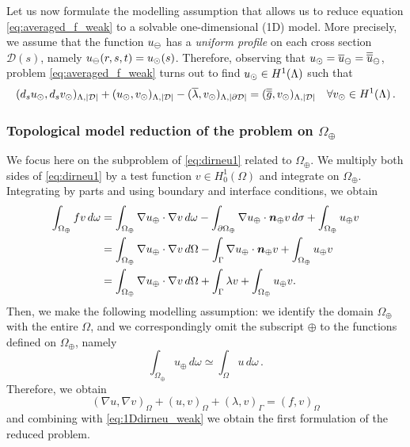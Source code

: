 \documentclass[r]{siamart171218}
\begin{document}
Let us now formulate the modelling assumption that allows us to reduce equation \eqref{eq:averaged_f_weak} to a solvable one-dimensional (1D) model.
More precisely, we assume that the function $u_{\ominus}$ has a \emph{uniform profile} on each cross section $\mathcal{D}(s)$, namely $u_{\ominus}(r,s,t) = u_{\odot}(s)$.
Therefore, observing that $u_{\odot}=\overline{u}_{\ominus}=\overline{\overline{u}}_{\ominus}$, problem \eqref{eq:averaged_f_weak} turns out to find $u_{\odot} \in H^1(\Lambda)$ such that
\begin{equation}\label{eq:1Ddirneu_weak}
 (d_s \ud, d_s \vd)_{\Lambda,|\mathcal{D}|} 
+(\ud, \vd)_{\Lambda, |\D|}
-(\avrc{\lambda},\vd)_{\Lambda, |\DD|}
=  (\avrd{g},\vd)_{\Lambda, |\mathcal{D}|}
\quad \forall \vd \in H^1(\Lambda)\,.
\end{equation}

\subsubsection*{Topological model reduction of the problem on $\Omega_{\oplus}$}
We focus here on the subproblem of \eqref{eq:dirneu1} related to $\Omega_{\oplus}$.
We multiply both sides of \eqref{eq:dirneu1} by a test function $v\in H^1_0(\Omega)$ and integrate on $\Omega_\oplus$. Integrating by parts and using boundary and interface conditions, we obtain
\begin{equation*}
\begin{split}
\int_{\Omega _{\oplus}}fv\,d\omega&=
\int _{\Omega _{\oplus}}\nabla u_{\oplus} \cdot\nabla v\,d\omega -\int _{\partial \Omega _{\oplus}}\nabla u_{\oplus} \cdot \boldsymbol n_{\oplus} v\,d\sigma + \int_{\Omega_{\oplus}} u_{\oplus} v
\\
&=\int _{\Omega _{\oplus}}\nabla u_{\oplus} \cdot\nabla v\,d\Omega -\int_{\Gamma} \nabla u_{\oplus} \cdot \boldsymbol n_{\oplus} v + \int_{\Omega_{\oplus}} u_{\oplus} v
\\
&=\int _{\Omega _{\oplus}}\nabla u_{\oplus} \cdot\nabla v\,d\Omega +\int_{\Gamma} \lambda v + \int_{\Omega_{\oplus}} u_{\oplus} v.
\end{split}
\end{equation*} 
Then, we make the following modelling assumption:
we identify the domain $\Omega_{\oplus}$ with the entire $\Omega$, 
and we correspondingly omit the subscript $\oplus$ to the functions defined on $\Omega_{\oplus}$,
namely
\begin{equation*}
\int_{\Omega_{\oplus}} u_\oplus\, d\omega \simeq \int_{\Omega} u\, d\omega\,.
\end{equation*}
Therefore, we obtain 
\begin{equation*}
(\nabla u ,\nabla v)_{\Omega} +(u,v)_{\Omega}+(\lambda, v)_{\Gamma}  =(f,v)_{\Omega}
\end{equation*}
and combining with \eqref{eq:1Ddirneu_weak} we obtain the first formulation of the reduced problem.
\end{document}
